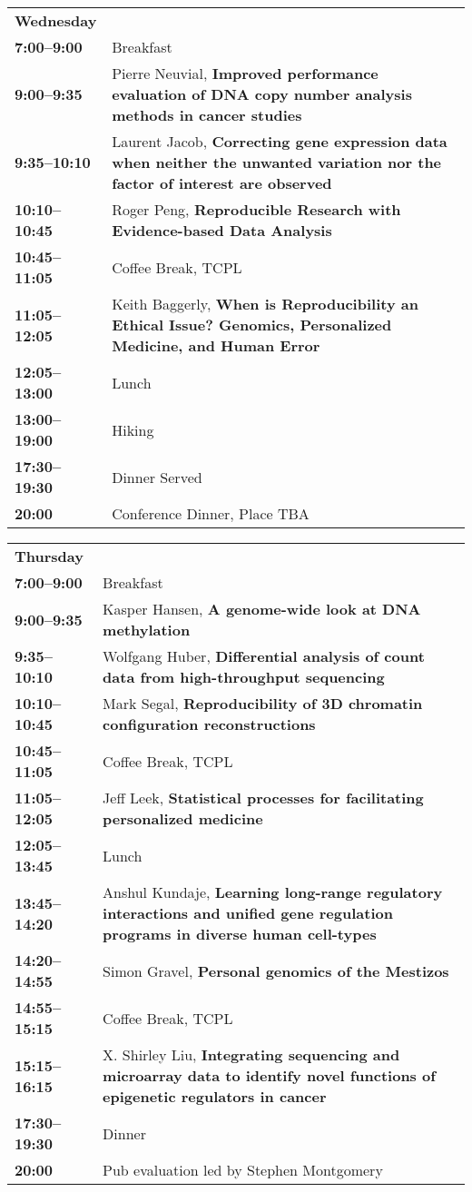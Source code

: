 \documentclass[11pt]{article}
\begin{document}
\begin{tabular}{ p{1in} p{5.8in} } 
{\bf\large Wednesday} & \\

{\bf 7:00--9:00}  & Breakfast\\
{\bf 9:00--9:35}  &  Pierre Neuvial, {\bf Improved performance evaluation of DNA copy number analysis methods in cancer studies}\\
{\bf 9:35--10:10}  &  Laurent Jacob, {\bf Correcting gene expression data when neither the unwanted variation nor the factor of interest are observed}\\
{\bf 10:10--10:45}  &  Roger Peng, {\bf Reproducible Research with Evidence-based Data Analysis}\\
{\bf 10:45--11:05} & Coffee Break, TCPL\\
{\bf 11:05--12:05}  &  Keith Baggerly, {\bf When is Reproducibility an Ethical Issue? Genomics, Personalized Medicine, and Human Error}\\
{\bf 12:05--13:00} & Lunch\\
{\bf 13:00--19:00} & Hiking\\
{\bf 17:30--19:30} & Dinner Served\\
{\bf 20:00} & Conference Dinner, Place TBA\\
\end{tabular}

\begin{tabular}{ p{1in} p{5.8in} } 
{\bf\large Thursday} & \\

{\bf 7:00--9:00}  & Breakfast\\
{\bf 9:00--9:35}  &  Kasper Hansen, {\bf A genome-wide look at DNA methylation}\\
{\bf 9:35--10:10}  &  Wolfgang Huber, {\bf Differential analysis of count data from high-throughput sequencing}\\
{\bf 10:10--10:45}  &  Mark Segal, {\bf Reproducibility of 3D chromatin configuration reconstructions}\\
{\bf 10:45--11:05} & Coffee Break, TCPL\\
{\bf 11:05--12:05}  & Jeff Leek, {\bf Statistical processes for facilitating personalized medicine}\\
{\bf 12:05--13:45}& Lunch\\
{\bf 13:45--14:20}  &  Anshul Kundaje, {\bf Learning long-range regulatory interactions and unified gene regulation programs in diverse human cell-types}\\
{\bf 14:20--14:55}  &  Simon Gravel, {\bf Personal genomics of the Mestizos}\\

{\bf 14:55--15:15} & Coffee Break, TCPL\\
{\bf 15:15--16:15}  &  X. Shirley Liu, {\bf Integrating sequencing and microarray data to identify novel functions of epigenetic regulators in cancer}\\
{\bf 17:30--19:30} & Dinner\\
{\bf 20:00}  & Pub evaluation led by Stephen Montgomery\\
\end{tabular}
\end{document}
